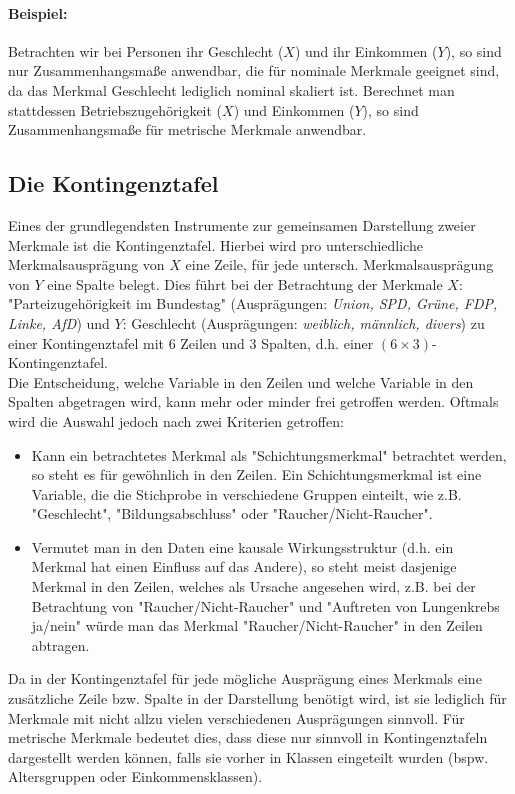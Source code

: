 \documentclass[a4paper]{article}
\begin{document}
\noindent \paragraph{Beispiel:} Betrachten wir bei Personen ihr Geschlecht ($X$) und ihr Einkommen ($Y$), so sind nur Zusammenhangsmaße anwendbar, die für nominale Merkmale geeignet sind, da das Merkmal Geschlecht lediglich nominal skaliert ist. Berechnet man stattdessen Betriebszugehörigkeit ($X$) und Einkommen ($Y$), so sind Zusammenhangsmaße für metrische Merkmale anwendbar.

\subsection{Die Kontingenztafel}
Eines der grundlegendsten Instrumente zur gemeinsamen Darstellung zweier Merkmale ist die Kontingenztafel.
Hierbei wird pro unterschiedliche Merkmalsausprägung von $X$ eine Zeile, für jede untersch. Merkmalsausprägung von $Y$ eine Spalte belegt. Dies führt bei der Betrachtung der Merkmale $X$: "Parteizugehörigkeit im Bundestag" (Ausprägungen: \textit{Union, SPD, Grüne, FDP, Linke, AfD}) und $Y$: Geschlecht (Ausprägungen: \textit{weiblich, männlich, divers}) zu einer Kontingenztafel mit 6 Zeilen und 3 Spalten, d.h. einer $(6\times3)$-Kontingenztafel.\\
Die Entscheidung, welche Variable in den Zeilen und welche Variable in den Spalten abgetragen wird, kann mehr oder minder frei getroffen werden. Oftmals wird die Auswahl jedoch nach zwei Kriterien getroffen:
\begin{itemize}
    \item Kann ein betrachtetes Merkmal als "Schichtungsmerkmal" betrachtet werden, so steht es für gewöhnlich in den Zeilen. Ein Schichtungsmerkmal ist eine Variable, die die Stichprobe in verschiedene Gruppen einteilt, wie z.B. "Geschlecht", "Bildungsabschluss" oder "Raucher/Nicht-Raucher".
    \item Vermutet man in den Daten eine kausale Wirkungsstruktur (d.h. ein Merkmal hat einen Einfluss auf das Andere), so steht meist dasjenige Merkmal in den Zeilen, welches als Ursache angesehen wird, z.B.
    bei der Betrachtung von "Raucher/Nicht-Raucher" und "Auftreten von Lungenkrebs ja/nein" würde man das Merkmal "Raucher/Nicht-Raucher" in den Zeilen abtragen.
\end{itemize}
Da in der Kontingenztafel für jede mögliche Ausprägung eines Merkmals eine zusätzliche Zeile bzw. Spalte in der Darstellung benötigt wird, ist sie lediglich für Merkmale mit nicht allzu vielen verschiedenen Ausprägungen sinnvoll. Für metrische Merkmale bedeutet dies, dass diese nur sinnvoll in Kontingenztafeln dargestellt werden können, falls sie vorher in Klassen eingeteilt wurden (bspw. Altersgruppen oder Einkommensklassen).\\
\end{document}
